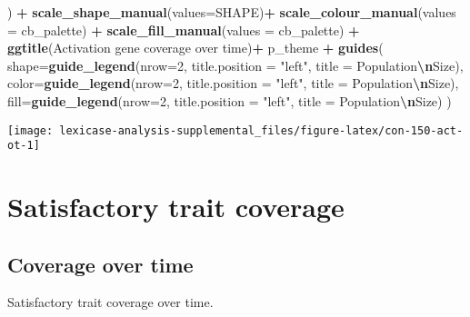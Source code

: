 \documentclass[
]{book}
\newenvironment{Shaded}{\begin{snugshade}}{\end{snugshade}}
\newcommand{\AttributeTok}[1]{\textcolor[rgb]{0.13,0.29,0.53}{#1}}
\newcommand{\DecValTok}[1]{\textcolor[rgb]{0.00,0.00,0.81}{#1}}
\newcommand{\FunctionTok}[1]{\textcolor[rgb]{0.13,0.29,0.53}{\textbf{#1}}}
\newcommand{\NormalTok}[1]{#1}
\newcommand{\SpecialCharTok}[1]{\textcolor[rgb]{0.81,0.36,0.00}{\textbf{#1}}}
\newcommand{\StringTok}[1]{\textcolor[rgb]{0.31,0.60,0.02}{#1}}
\begin{document}
\begin{Shaded}
\begin{Highlighting}[]
\NormalTok{  ) }\SpecialCharTok{+}
  \FunctionTok{scale\_shape\_manual}\NormalTok{(}\AttributeTok{values=}\NormalTok{SHAPE)}\SpecialCharTok{+}
  \FunctionTok{scale\_colour\_manual}\NormalTok{(}\AttributeTok{values =}\NormalTok{ cb\_palette) }\SpecialCharTok{+}
  \FunctionTok{scale\_fill\_manual}\NormalTok{(}\AttributeTok{values =}\NormalTok{ cb\_palette) }\SpecialCharTok{+}
  \FunctionTok{ggtitle}\NormalTok{(}\StringTok{\textquotesingle{}Activation gene coverage over time\textquotesingle{}}\NormalTok{)}\SpecialCharTok{+}
\NormalTok{  p\_theme }\SpecialCharTok{+}
  \FunctionTok{guides}\NormalTok{(}
    \AttributeTok{shape=}\FunctionTok{guide\_legend}\NormalTok{(}\AttributeTok{nrow=}\DecValTok{2}\NormalTok{, }\AttributeTok{title.position =} \StringTok{"left"}\NormalTok{, }\AttributeTok{title =} \StringTok{\textquotesingle{}Population}\SpecialCharTok{\textbackslash{}n}\StringTok{Size\textquotesingle{}}\NormalTok{),}
    \AttributeTok{color=}\FunctionTok{guide\_legend}\NormalTok{(}\AttributeTok{nrow=}\DecValTok{2}\NormalTok{, }\AttributeTok{title.position =} \StringTok{"left"}\NormalTok{, }\AttributeTok{title =} \StringTok{\textquotesingle{}Population}\SpecialCharTok{\textbackslash{}n}\StringTok{Size\textquotesingle{}}\NormalTok{),}
    \AttributeTok{fill=}\FunctionTok{guide\_legend}\NormalTok{(}\AttributeTok{nrow=}\DecValTok{2}\NormalTok{, }\AttributeTok{title.position =} \StringTok{"left"}\NormalTok{, }\AttributeTok{title =} \StringTok{\textquotesingle{}Population}\SpecialCharTok{\textbackslash{}n}\StringTok{Size\textquotesingle{}}\NormalTok{)}
\NormalTok{  )}
\end{Highlighting}
\end{Shaded}

\texttt{[image: lexicase-analysis-supplemental\_files/figure-latex/con-150-act-ot-1]}

\hypertarget{satisfactory-trait-coverage}{%
\section{Satisfactory trait coverage}\label{satisfactory-trait-coverage}}

\hypertarget{coverage-over-time-1}{%
\subsection{Coverage over time}\label{coverage-over-time-1}}

Satisfactory trait coverage over time.
\end{document}
